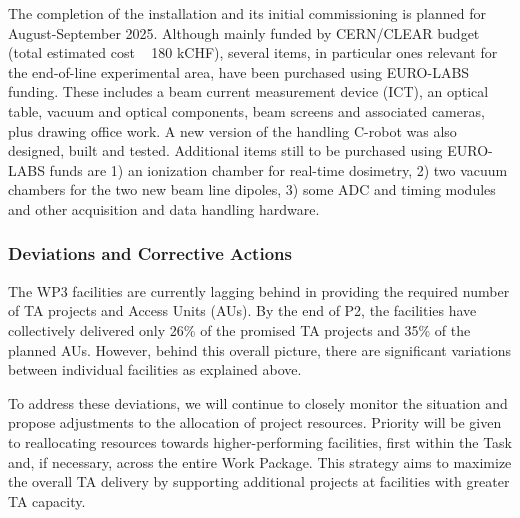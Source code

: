{The completion of the installation and its initial commissioning is planned for August-September 2025. Although mainly funded by CERN/CLEAR budget (total estimated cost ~ 180 kCHF), several items, in particular ones relevant for the end-of-line experimental area, have been purchased using EURO-LABS funding. These includes a beam current measurement device (ICT), an optical table, vacuum and optical components, beam screens and associated cameras, plus drawing office work. A new version of the handling C-robot was also designed, built and tested. Additional items still to be purchased using EURO-LABS funds are 1) an ionization chamber for real-time dosimetry, 2) two vacuum chambers for the two new beam line dipoles, 3) some ADC and timing modules and other acquisition and data handling hardware.



\subsubsection*{Deviations and Corrective Actions}
\label{sec:wp3_deviations}

The WP3 facilities are currently lagging behind in providing the required number of TA projects and Access Units (AUs). By the end of P2, the facilities have collectively delivered only 26\% of the promised TA projects and 35\% of the planned AUs. However, behind this overall picture, there are significant variations between individual facilities as explained above.

To address these deviations, we will continue to closely monitor the situation and propose adjustments to the allocation of project resources. Priority will be given to reallocating resources towards higher-performing facilities, first within the Task and, if necessary, across the entire Work Package. This strategy aims to maximize the overall TA delivery by supporting additional projects at facilities with greater TA capacity.

}
